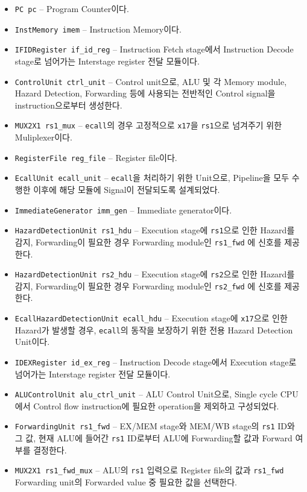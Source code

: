 \documentclass{scrartcl}
\begin{document}
\begin{itemize}
  \item \texttt{PC pc} -- Program Counter이다.
  \item \texttt{InstMemory imem} -- Instruction Memory이다.
  \item \texttt{IFIDRegister if\_id\_reg} -- Instruction Fetch stage에서 Instruction Decode stage로 넘어가는 Interstage register 전달 모듈이다.
  \item \texttt{ControlUnit ctrl\_unit} -- Control unit으로, ALU 및 각 Memory module, Hazard Detection, Forwarding 등에 사용되는 전반적인 Control signal을 instruction으로부터 생성한다.
  \item \texttt{MUX2X1 rs1\_mux} -- \texttt{ecall}의 경우 고정적으로 \texttt{x17}을 \texttt{rs1}으로 넘겨주기 위한 Muliplexer이다.
  \item \texttt{RegisterFile reg\_file} -- Register file이다.
  \item \texttt{EcallUnit ecall\_unit} -- \texttt{ecall}을 처리하기 위한 Unit으로, Pipeline을 모두 수행한 이후에 해당 모듈에 Signal이 전달되도록 설계되었다.
  \item \texttt{ImmediateGenerator imm\_gen} -- Immediate generator이다.
  \item \texttt{HazardDetectionUnit rs1\_hdu} -- Execution stage에 \texttt{rs1}으로 인한 Hazard를 감지, Forwarding이 필요한 경우 Forwarding module인 \texttt{rs1\_fwd} 에 신호를 제공한다.
  \item \texttt{HazardDetectionUnit rs2\_hdu} -- Execution stage에 \texttt{rs2}으로 인한 Hazard를 감지, Forwarding이 필요한 경우 Forwarding module인 \texttt{rs2\_fwd} 에 신호를 제공한다.
  \item \texttt{EcallHazardDetectionUnit ecall\_hdu} -- Execution stage에 \texttt{x17}으로 인한 Hazard가 발생할 경우, \texttt{ecall}의 동작을 보장하기 위한 전용 Hazard Detection Unit이다.
  \item \texttt{IDEXRegister id\_ex\_reg} -- Instruction Decode stage에서 Execution stage로 넘어가는 Interstage register 전달 모듈이다.
  \item \texttt{ALUControlUnit alu\_ctrl\_unit} -- ALU Control Unit으로, Single cycle CPU에서 Control flow instruction에 필요한 operation을 제외하고 구성되었다.
  \item \texttt{ForwardingUnit rs1\_fwd} -- EX/MEM stage와 MEM/WB stage의 \texttt{rs1} ID와 그 값, 현재 ALU에 들어간 \texttt{rs1} ID로부터 ALU에 Forwarding할 값과 Forward 여부를 결정한다.
  \item \texttt{MUX2X1 rs1\_fwd\_mux} -- ALU의 \texttt{rs1} 입력으로 Register file의 값과 \texttt{rs1\_fwd} Forwarding unit의 Forwarded value 중 필요한 값을 선택한다.

\end{itemize}
\end{document}
